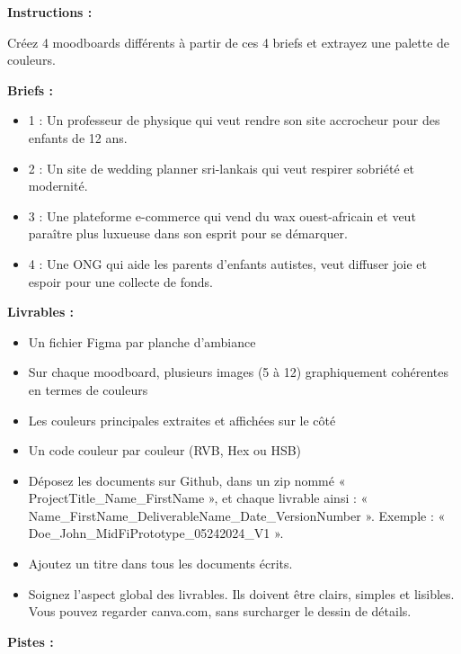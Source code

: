 \makeheaderfiles

\textbf{Instructions :}

Créez 4 moodboards différents à partir de ces 4 briefs et extrayez une palette de couleurs.

\textbf{Briefs :}

\begin{itemize}
\item 1 : Un professeur de physique qui veut rendre son site accrocheur pour des enfants de 12 ans.
\item 2 : Un site de wedding planner sri-lankais qui veut respirer sobriété et modernité.
\item 3 : Une plateforme e-commerce qui vend du wax ouest-africain et veut paraître plus luxueuse dans son esprit pour se démarquer.
\item 4 : Une ONG qui aide les parents d'enfants autistes, veut diffuser joie et espoir pour une collecte de fonds.
\end{itemize}

\textbf{Livrables :}

\begin{itemize}
\item Un fichier Figma par planche d'ambiance
\item Sur chaque moodboard, plusieurs images (5 à 12) graphiquement cohérentes en termes de couleurs
\item Les couleurs principales extraites et affichées sur le côté
\item Un code couleur par couleur (RVB, Hex ou HSB)
\item Déposez les documents sur Github, dans un zip nommé « ProjectTitle\_Name\_FirstName », et chaque livrable ainsi : « Name\_FirstName\_DeliverableName\_Date\_VersionNumber ». Exemple : « Doe\_John\_MidFiPrototype\_05242024\_V1 ».
\item Ajoutez un titre dans tous les documents écrits.
\item Soignez l'aspect global des livrables. Ils doivent être clairs, simples et lisibles. Vous pouvez regarder canva.com, sans surcharger le dessin de détails.
\end{itemize}

\textbf{Pistes :}

